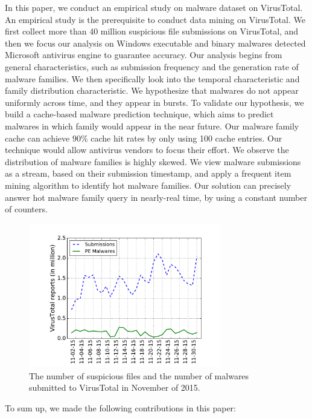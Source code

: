 In this paper, we conduct an empirical study on malware dataset on VirusTotal. 
An empirical study is the prerequisite to conduct data mining on VirusTotal. 
We first collect more than 40 million suspicious file submissions on VirusTotal, and then 
we focus our analysis on Windows executable and binary malwares detected Microsoft
antivirus engine to guarantee accuracy. 
Our analysis begins from general characteristics, such as submission frequency and the generation rate of malware families. 
We then specifically look into the temporal characteristic and family distribution characteristic. 
We hypothesize that malwares do not appear uniformly across time, and they appear in bursts. 
To validate our hypothesis, we build a cache-based malware prediction technique, which aims to predict malwares in which family would appear in the near future. 
Our malware family cache can achieve 90\% cache hit rates by only using 100 cache entries.
Our technique would allow antivirus vendors to focus their effort. 
We observe the distribution of malware families is highly skewed. 
We view malware submissions as a stream, based on their submission timestamp, and apply a frequent item mining algorithm to identify hot malware families. 
Our solution can precisely answer hot malware family query in nearly-real time, by using a constant number of counters. 


\begin{figure}[t!]
\begin{center}
\includegraphics[width=3.3in]{figure/nov}
\caption{The number of suspicious files and the number of malwares submitted to VirusTotal in November of 2015. }
\label{fig:subnum}
\end{center}
\end{figure}

To sum up, we made the following contributions in this paper:

